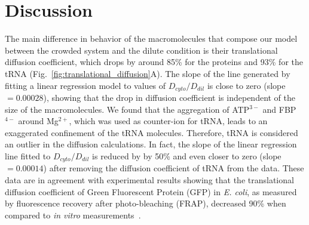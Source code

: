 \documentclass[journal=jpcisd8,manuscript=article]{achemso}
\begin{document}
\section*{Discussion}\label{sec:dissc}
The main difference in behavior of the macromolecules that
compose our model between the crowded system and the dilute condition is
their translational diffusion coefficient, which drops by around
85\% for the proteins and 93\% for the tRNA
(Fig.~\ref{fig:translational_diffusion}A). The slope of the line
generated by fitting a linear regression model to values of
$D_{cyto}/D_{dil}$ is close to zero (slope $= 0.00028$), showing that
the drop in diffusion coefficient is independent of the size of the
macromolecules. We found that the aggregation of ATP$^{3-}$ and
FBP$^{4-}$ around Mg$^{2+}$, which was used as counter-ion for tRNA,
leads to an exaggerated confinement of the tRNA molecules.  Therefore,
tRNA is considered an outlier in the diffusion calculations. In
fact, the slope of the linear regression line fitted to
$D_{cyto}/D_{dil}$ is reduced by by 50\% and  even closer to zero
(slope $= 0.00014$) after removing the diffusion coefficient of tRNA
from the data. These data are in agreement with experimental results
showing that the translational diffusion coefficient of Green
Fluorescent Protein (GFP) in {\em E. coli}, as measured by
fluorescence recovery after photo-bleaching (FRAP), decreased 90\%
when compared to {\em in vitro}
measurements~\cite{Elowitz1999,Konopka2006}.

\end{document}
